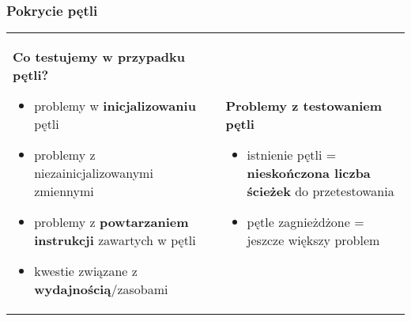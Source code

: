 \documentclass[../main.tex]{subfiles}
\begin{document}
    \subsubsection{Pokrycie pętli}

    \begin{table}[H]
        \begin{center}
            \begin{tabular}{ p{8cm}  p{8cm} }
                \textbf{Co testujemy w przypadku pętli?}
                \begin{itemize}
                    \item problemy w \textbf{inicjalizowaniu} pętli
                    \item problemy z niezainicjalizowanymi zmiennymi
                    \item problemy z \textbf{powtarzaniem instrukcji} zawartych w pętli
                    \item kwestie związane z \textbf{wydajnością}/zasobami
                \end{itemize}
                &
                \textbf{Problemy z testowaniem pętli}
                \begin{itemize}
                    \item istnienie pętli = \textbf{nieskończona liczba ścieżek} do przetestowania
                    \item pętle zagnieżdżone = jeszcze większy problem
                \end{itemize}
            \end{tabular}
        \end{center}
    \end{table}
\end{document}
